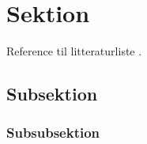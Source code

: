 \section{Sektion}
\lipsum[1]
Reference til litteraturliste \citep{lipsum2014}.
\subsection{Subsektion}
\lipsum[2]
\subsubsection{Subsubsektion}
\lipsum[3]
